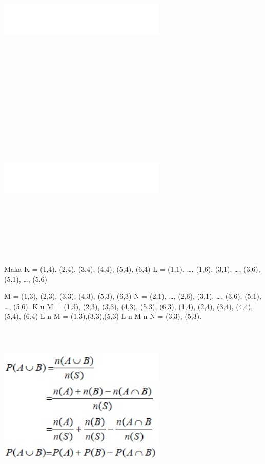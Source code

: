 \documentclass[11pt,fleqn]{book} %
\begin{document}
{{\includegraphics[width = 8cm, height= 8cm]{Pictures/muammar3.jpg}
\includegraphics[width = 8cm, height= 8cm]{Pictures/muammar3.jpg}

Maka K = {(1,4), (2,4), (3,4), (4,4), (5,4), (6,4)}
L = (1,1), …, (1,6), (3,1), …, (3,6), (5,1), …, (5,6)}
M = {(1,3), (2,3), (3,3), (4,3), (5,3), (6,3)}
N = {(2,1), …, (2,6), (3,1), …, (3,6), (5,1), …, (5,6)}.
K u M = {(1,3), (2,3), (3,3), (4,3), (5,3), (6,3), (1,4), (2,4), (3,4), (4,4), (5,4), (6,4)}
L n M = {(1,3),(3,3),(5,3)}
L n M n N = {(3,3), (5,3)}.

\includegraphics[width = 8cm, height= 8cm]{Pictures/muammar4.jpg}

}
\end{document}
